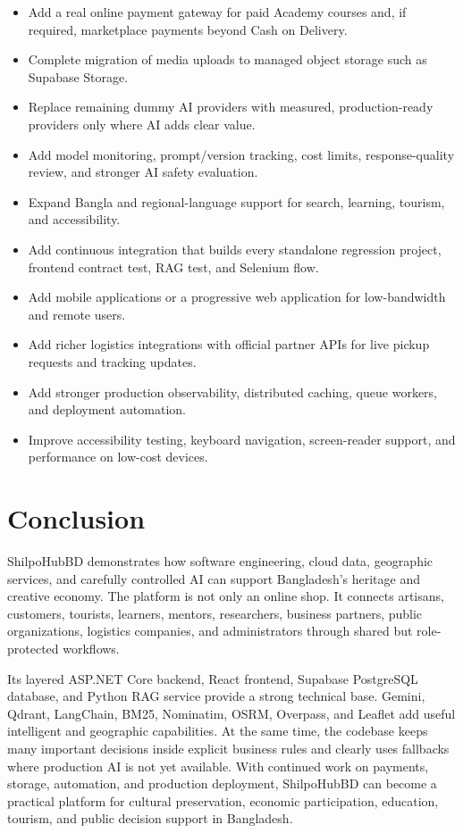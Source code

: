\documentclass[12pt,a4paper]{report}
\begin{document}
\begin{itemize}
  \item Add a real online payment gateway for paid Academy courses and, if required, marketplace payments beyond Cash on Delivery.
  \item Complete migration of media uploads to managed object storage such as Supabase Storage.
  \item Replace remaining dummy AI providers with measured, production-ready providers only where AI adds clear value.
  \item Add model monitoring, prompt/version tracking, cost limits, response-quality review, and stronger AI safety evaluation.
  \item Expand Bangla and regional-language support for search, learning, tourism, and accessibility.
  \item Add continuous integration that builds every standalone regression project, frontend contract test, RAG test, and Selenium flow.
  \item Add mobile applications or a progressive web application for low-bandwidth and remote users.
  \item Add richer logistics integrations with official partner APIs for live pickup requests and tracking updates.
  \item Add stronger production observability, distributed caching, queue workers, and deployment automation.
  \item Improve accessibility testing, keyboard navigation, screen-reader support, and performance on low-cost devices.
\end{itemize}

\chapter{Conclusion}

ShilpoHubBD demonstrates how software engineering, cloud data, geographic services, and carefully controlled AI can support Bangladesh's heritage and creative economy. The platform is not only an online shop. It connects artisans, customers, tourists, learners, mentors, researchers, business partners, public organizations, logistics companies, and administrators through shared but role-protected workflows.

Its layered ASP.NET Core backend, React frontend, Supabase PostgreSQL database, and Python RAG service provide a strong technical base. Gemini, Qdrant, LangChain, BM25, Nominatim, OSRM, Overpass, and Leaflet add useful intelligent and geographic capabilities. At the same time, the codebase keeps many important decisions inside explicit business rules and clearly uses fallbacks where production AI is not yet available. With continued work on payments, storage, automation, and production deployment, ShilpoHubBD can become a practical platform for cultural preservation, economic participation, education, tourism, and public decision support in Bangladesh.
\end{document}
